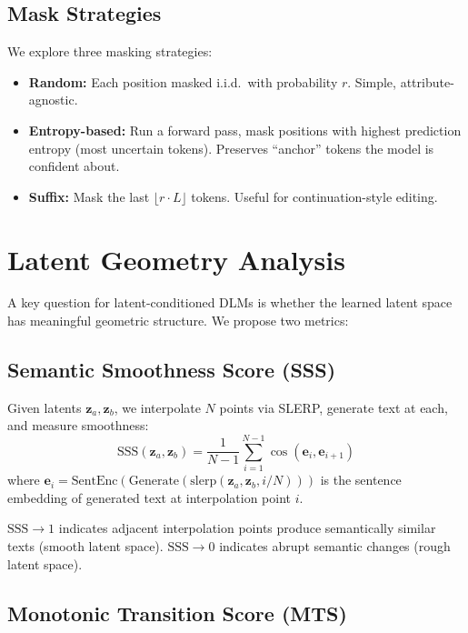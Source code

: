 \documentclass{article}
\begin{document}
\subsection{Mask Strategies}

We explore three masking strategies:

\begin{itemize}
    \item \textbf{Random:} Each position masked i.i.d.\ with probability $r$. Simple, attribute-agnostic.
    \item \textbf{Entropy-based:} Run a forward pass, mask positions with highest prediction entropy (most uncertain tokens). Preserves ``anchor'' tokens the model is confident about.
    \item \textbf{Suffix:} Mask the last $\lfloor r \cdot L \rfloor$ tokens. Useful for continuation-style editing.
\end{itemize}

\section{Latent Geometry Analysis}

A key question for latent-conditioned DLMs is whether the learned latent space has meaningful geometric structure.
We propose two metrics:

\subsection{Semantic Smoothness Score (SSS)}

Given latents $\mathbf{z}_a, \mathbf{z}_b$, we interpolate $N$ points via SLERP, generate text at each, and measure smoothness:
\begin{equation}
    \text{SSS}(\mathbf{z}_a, \mathbf{z}_b) = \frac{1}{N-1} \sum_{i=1}^{N-1} \cos\left(\mathbf{e}_i, \mathbf{e}_{i+1}\right)
\end{equation}
where $\mathbf{e}_i = \text{SentEnc}(\text{Generate}(\text{slerp}(\mathbf{z}_a, \mathbf{z}_b, i/N)))$ is the sentence embedding of generated text at interpolation point $i$.

$\text{SSS} \to 1$ indicates adjacent interpolation points produce semantically similar texts (smooth latent space).
$\text{SSS} \to 0$ indicates abrupt semantic changes (rough latent space).

\subsection{Monotonic Transition Score (MTS)}
\end{document}
